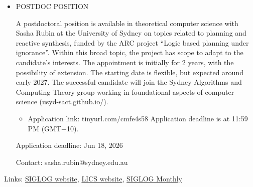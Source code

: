 \documentclass[prodmode,acmtecs]{acmsmall} %
\begin{document}
\begin{itemize}\item  POSTDOC POSITION  
 
  A postdoctoral position is available in theoretical computer science with Sasha Rubin at the University of Sydney on topics related to planning and reactive synthesis, funded by the ARC project ``Logic based planning under ignorance''. Within this broad topic, the project has scope to adapt to the candidate's interests. The appointment is initially for 2 years, with the possibility of extension. The starting date is flexible, but expected around early 2027. The successful candidate will join the Sydney Algorithms and Computing Theory group working in foundational aspects of computer science (usyd-sact.github.io/). 
 
\begin{itemize}\item  Application link: tinyurl.com/cmfe4s58 Application deadline is at 11:59 PM (GMT+10).
\end{itemize} 
Application deadline: Jun 18, 2026 
 
  Contact: sasha.rubin@sydney.edu.au 
 
\end{itemize}


\bigskip Links: \href{http://siglog.org/}{SIGLOG website}, \href{https://lics.siglog.org}{LICS website}, \href{https://lics.siglog.org/newsletters/}{SIGLOG Monthly}
\end{document}

